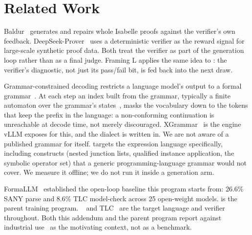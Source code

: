 \section{Related Work}\label{sec:relatedworks}

 Baldur~\cite{first2023baldur}
generates and repairs whole Isabelle proofs against the verifier's own
feedback. DeepSeek-Prover~\cite{xin2024deepseek} uses a deterministic verifier
as the reward signal for large-scale synthetic proof data. Both treat the
verifier as part of the generation loop rather than as a final judge. Framing
L applies the same idea to \tlaplus{}: the verifier's diagnostic, not just its
pass/fail bit, is fed back into the next draw.

 Grammar-constrained decoding
restricts a language model's output to a formal grammar~\cite{geng2023grammar}.
At each step an index built from the grammar, typically a finite automaton
over the grammar's states~\cite{willard2023efficient}, masks the vocabulary
down to the tokens that keep the prefix in the language: a non-conforming
continuation is unreachable at decode time, not merely discouraged.
XGrammar~\cite{dong2024xgrammar} is the engine vLLM exposes for this, and the
dialect \gfile{} is written in. We are not aware of a
published grammar for \tlaplus{} itself. \gfile{}
targets the \tlaplus{} expression language specifically, including
constructs (nested junction lists, qualified instance application, the
symbolic operator set) that a generic programming-language grammar would not
cover. We measure it offline; we do not run it inside a generation arm.

 FormaLLM~\cite{bisharat2026formallm}
established the open-loop baseline this program starts from: 26.6\% SANY
parse and 8.6\% TLC model-check across 25 open-weight models. \ours{} is the
parent training program. \tlaplus{}~\cite{lamport2002specifying} and
TLC~\cite{yu1999tlc} are the target language and verifier throughout. Both
this addendum and the parent program report against industrial \tlaplus{}
use~\cite{Newcombe2015,cirstea_validating_2024} as the motivating context, not
as a benchmark.
